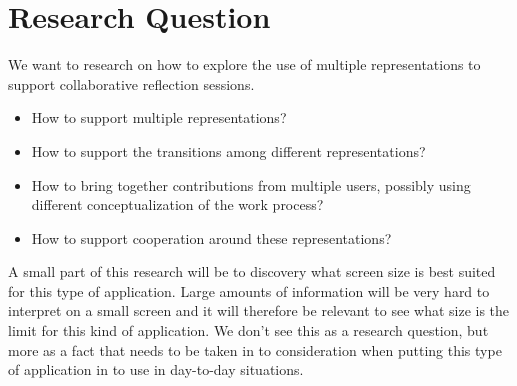 \section{Research Question}
We want to research on how to explore the use of multiple representations to support collaborative reflection sessions.

\begin{itemize}
	\item How to support multiple representations?
	\item How to support the transitions among different representations?
	\item How to bring together contributions from multiple users, possibly using different conceptualization of the work process?
	\item How to support cooperation around these representations?
\end{itemize}

A small part of this research will be to discovery what screen size is best suited for this type of application. Large amounts of information will be very hard to interpret on a small screen and it will therefore be relevant to see what size is the limit for this kind of application. We don’t see this as a research question, but more as a fact that needs to be taken in to consideration when putting this type of application in to use in day-to-day situations.